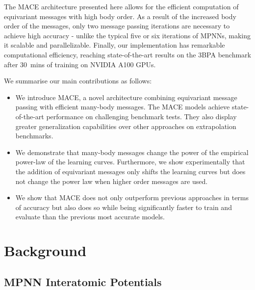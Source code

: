 \documentclass{article}
\begin{document}
The MACE architecture presented here allows for the efficient computation of equivariant messages with high body order.
As a result of the increased body order of the messages, only two message passing iterations are necessary to achieve high accuracy - unlike the typical five or six iterations of MPNNs, making it scalable and parallelizable.
Finally, our implementation has remarkable computational efficiency, reaching state-of-the-art results on the 3BPA benchmark after 30~mins of training on NVIDIA A100 GPUs.

We summarise our main contributions as follows:
\begin{itemize}
  \item We introduce MACE, a novel architecture combining equivariant message passing with efficient many-body messages. The MACE models achieve state-of-the-art performance on challenging benchmark tests. They also display greater generalization capabilities over other approaches on extrapolation benchmarks.
  \item We demonstrate that many-body messages change the power of the empirical power-law of the learning curves.
        Furthermore, we show experimentally that the addition of equivariant messages only shifts the learning curves but does not change the power law when higher order messages are used.
  \item We show that MACE does not only outperform previous approaches in terms of accuracy but also does so while being significantly faster to train and evaluate than the previous most accurate models.
\end{itemize}

\section{Background}
\label{sec:background}

\subsection{MPNN Interatomic Potentials}
\end{document}
